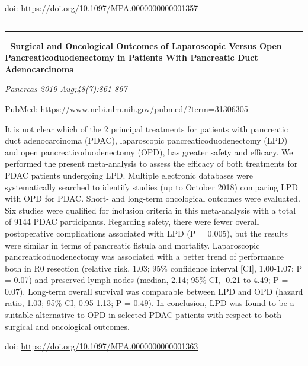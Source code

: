 \documentclass[]{article}
\begin{document}
doi: \url{https://doi.org/10.1097/MPA.0000000000001357}

{}

{}

\begin{center}\rule{0.5\linewidth}{\linethickness}\end{center}

\begin{center}\rule{0.5\linewidth}{\linethickness}\end{center}

 - \textbf{Surgical and Oncological Outcomes of Laparoscopic Versus Open
Pancreaticoduodenectomy in Patients With Pancreatic Duct Adenocarcinoma}

\emph{Pancreas 2019 Aug;48(7):861-867}

PubMed: \url{https://www.ncbi.nlm.nih.gov/pubmed/?term=31306305}

It is not clear which of the 2 principal treatments for patients with
pancreatic duct adenocarcinoma (PDAC), laparoscopic
pancreaticoduodenectomy (LPD) and open pancreaticoduodenectomy (OPD),
has greater safety and efficacy. We performed the present meta-analysis
to assess the efficacy of both treatments for PDAC patients undergoing
LPD. Multiple electronic databases were systematically searched to
identify studies (up to October 2018) comparing LPD with OPD for PDAC.
Short- and long-term oncological outcomes were evaluated. Six studies
were qualified for inclusion criteria in this meta-analysis with a total
of 9144 PDAC participants. Regarding safety, there were fewer overall
postoperative complications associated with LPD (P = 0.005), but the
results were similar in terms of pancreatic fistula and mortality.
Laparoscopic pancreaticoduodenectomy was associated with a better trend
of performance both in R0 resection (relative risk, 1.03; 95\%
confidence interval {[}CI{]}, 1.00-1.07; P = 0.07) and preserved lymph
nodes (median, 2.14; 95\% CI, -0.21 to 4.49; P = 0.07). Long-term
overall survival was comparable between LPD and OPD (hazard ratio, 1.03;
95\% CI, 0.95-1.13; P = 0.49). In conclusion, LPD was found to be a
suitable alternative to OPD in selected PDAC patients with respect to
both surgical and oncological outcomes.

doi: \url{https://doi.org/10.1097/MPA.0000000000001363}

{}

{}

\begin{center}\rule{0.5\linewidth}{\linethickness}\end{center}
\end{document}

